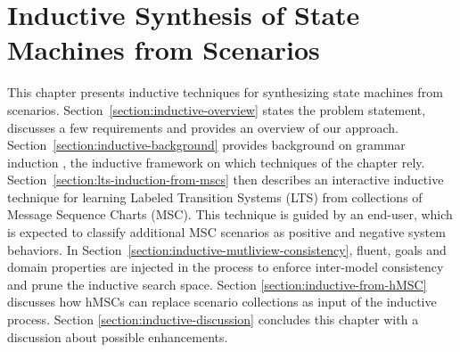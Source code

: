 \chapter{Inductive Synthesis of State Machines from Scenarios\label{chapter:inductive-synthesis}}

This chapter presents inductive techniques for synthesizing state machines from scenarios. Section~\ref{section:inductive-overview} states the problem statement, discusses a few requirements and provides an overview of our approach. Section~\ref{section:inductive-background} provides background on grammar induction \cite{Gold:1978}, the inductive framework on which techniques of the chapter rely. Section~\ref{section:lts-induction-from-mscs} then describes an interactive inductive technique for learning Labeled Transition Systems (LTS) from collections of Message Sequence Charts (MSC). This technique is guided by an end-user, which is expected to classify additional MSC scenarios as positive and negative system behaviors. In Section~\ref{section:inductive-mutliview-consistency}, fluent, goals and domain properties are injected in the process to enforce inter-model consistency and prune the inductive search space. Section \ref{section:inductive-from-hMSC} discusses how hMSCs can replace scenario collections as input of the inductive process. Section \ref{section:inductive-discussion} concludes this chapter with a discussion about possible enhancements. 







